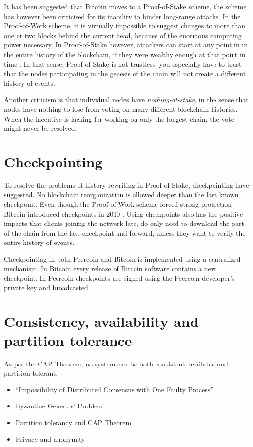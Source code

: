 \documentclass[oneside,a4paper,10pts,article]{memoir}
\begin{document}
It has been suggested that Bitcoin moves to a Proof-of-Stake scheme,
the scheme has however been criticised for its inability to hinder
long-range attacks. In the Proof-of-Work scheme, it is virtually
impossible to suggest changes to more than one or two blocks behind
the current head, because of the enormous computing power
necessary. In Proof-of-Stake however, attackers can start at any point
in in the entire history of the blockchain, if they were wealthy
enough at that point in time \cite{buterin2014onstake}. In that sense,
Proof-of-Stake is not trustless, you especially have to trust that the
nodes participating in the genesis of the chain will not create a
different history of events.

Another criticism is that individual nodes have
\textit{nothing-at-stake}, in the sense that nodes have nothing to
lose from voting on many different blockchain histories. When the
incentive is lacking for working on only the longest chain, the vote
might never be resolved.

\section{Checkpointing}
To resolve the problems of history-rewriting in Proof-of-Stake,
checkpointing have suggested. No blockchain reorganization is allowed
deeper than the last known checkpoint. Even though the Proof-of-Work
scheme forced strong protection Bitcoin introduced checkpoints in 2010
\cite{king2012ppcoin}. Using checkpoints also has the positive impacts
that clients joining the network late, do only need to download the
part of the chain from the last checkpoint and forward, unless they
want to verify the entire history of events.

Checkpointing in both Peercoin and Bitcoin is implemented using a
centralized mechanism. In Bitcoin every release of Bitcoin software
contains a new checkpoint. In Peercoin checkpoints are signed using
the Peercoin developer's private key and broadcasted.

\section{Consistency, availability and partition tolerance}
As per the CAP Theorem, no system can be both consistent, available
and partition tolerant.

\begin{itemize}
\item ``Impossibility of Distributed Consensus with One Faulty Process''
\item Byzantine Generals' Problem
\item Partition tolerancy and CAP Theorem
\item Privacy and anonymity
\end{itemize}
\end{document}
